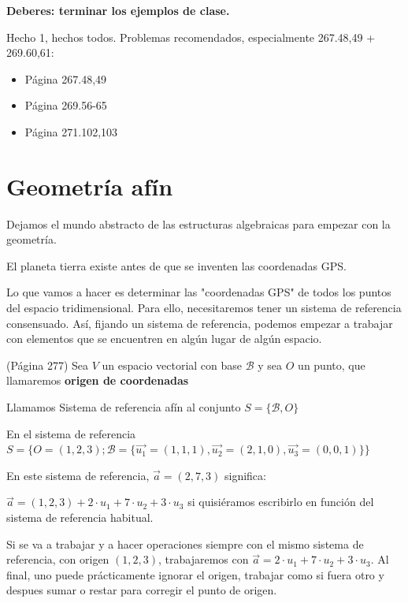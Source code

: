 \textbf{Deberes: terminar los ejemplos de clase.}

Hecho 1, hechos todos. Problemas recomendados, especialmente 267.48,49 + 269.60,61: 
\begin{itemize}
  \item Página 267.48,49
  \item Página 269.56-65
  \item Página 271.102,103
\end{itemize}

\section{Geometría afín}

Dejamos el mundo abstracto de las estructuras algebraicas para empezar con la geometría. 

El planeta tierra existe antes de que se inventen las coordenadas GPS. 


Lo que vamos a hacer es determinar las "coordenadas GPS" de todos los puntos del espacio tridimensional.
%
Para ello, necesitaremos tener un sistema de referencia consensuado.
%
Así, fijando un sistema de referencia, podemos empezar a trabajar con elementos que se encuentren en algún lugar de algún espacio. 



\begin{defn} (Página 277)
Sea $V$ un espacio vectorial con base $\mathcal{B}$ y sea $O$ un punto, que llamaremos \textbf{origen de coordenadas}

Llamamos Sistema de referencia afín al conjunto $S = \{\mathcal{B},O\}$
\end{defn}

\begin{example}
En el sistema de referencia $S=\{O = (1,2,3); \mathcal{B} = \{\vec{u_1} = (1,1,1), \vec{u_2} = (2,1,0), \vec{u_3} = (0,0,1)\}\}$

En este sistema de referencia, $\vec{a} = (2,7,3)$ significa:

$\vec{a} =  (1,2,3) + 2\cdot u_1 + 7\cdot u_2 + 3\cdot u_3$ si quisiéramos escribirlo en función del sistema de referencia habitual.

\label{example::origen_ref}

Si se va a trabajar y a hacer operaciones siempre con el mismo sistema de referencia, con origen $(1,2,3)$, trabajaremos con $\vec{a} = 2\cdot u_1 + 7\cdot u_2 + 3\cdot u_3$.
%
Al final, uno puede prácticamente ignorar el origen, trabajar como si fuera otro y despues sumar o restar para corregir el punto de origen.

\end{example}

